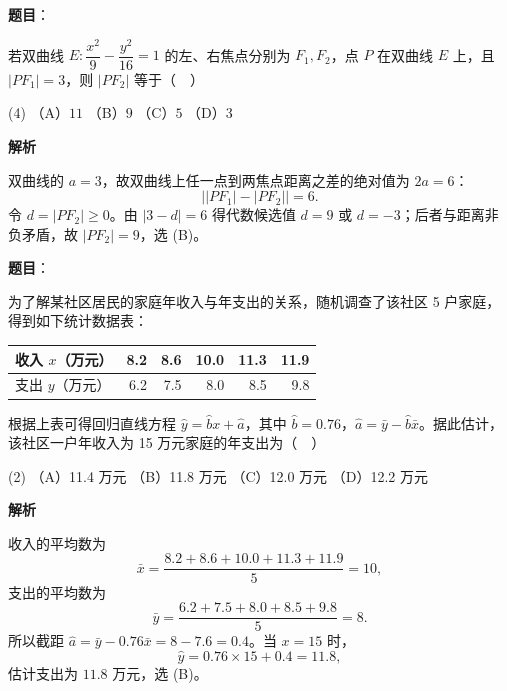 \begin{answer}

\textbf{题目}：

若双曲线 $E:\dfrac{x^2}{9}-\dfrac{y^2}{16}=1$ 的左、右焦点分别为 $F_1,F_2$，点 $P$ 在双曲线 $E$ 上，且 $|PF_1|=3$，则 $|PF_2|$ 等于（　）

\begin{gkopts}(4)
\task （A）$11$
\task （B）$9$
\task （C）$5$
\task （D）$3$
\end{gkopts}

\textbf{解析}

双曲线的 $a=3$，故双曲线上任一点到两焦点距离之差的绝对值为 $2a=6$：
\nopagebreak[4]
\[
\bigl||PF_1|-|PF_2|\bigr|=6.
\]
令 $d=|PF_2|\geqslant0$。由 $|3-d|=6$ 得代数候选值 $d=9$ 或 $d=-3$；后者与距离非负矛盾，故 $|PF_2|=9$，选 (B)。


\end{answer}
\begin{answer}

\textbf{题目}：

为了解某社区居民的家庭年收入与年支出的关系，随机调查了该社区 5 户家庭，得到如下统计数据表：

\begin{center}
\begin{tabular}{lrrrrr}
\toprule
收入 $x$（万元） & 8.2 & 8.6 & 10.0 & 11.3 & 11.9 \\
\midrule
支出 $y$（万元） & 6.2 & 7.5 & 8.0 & 8.5 & 9.8 \\
\bottomrule
\end{tabular}
\end{center}

根据上表可得回归直线方程 $\hat{y}=\hat{b}x+\hat{a}$，其中 $\hat{b}=0.76$，$\hat{a}=\bar{y}-\hat{b}\bar{x}$。据此估计，该社区一户年收入为 15 万元家庭的年支出为（　）

\begin{gkopts}(2)
\task （A）11.4 万元
\task （B）11.8 万元
\task （C）12.0 万元
\task （D）12.2 万元
\end{gkopts}

\textbf{解析}

收入的平均数为
\nopagebreak[4]
\[
\bar{x}=\frac{8.2+8.6+10.0+11.3+11.9}{5}=10,
\]
支出的平均数为
\nopagebreak[4]
\[
\bar{y}=\frac{6.2+7.5+8.0+8.5+9.8}{5}=8.
\]
所以截距 $\hat a=\bar y-0.76\bar x=8-7.6=0.4$。当 $x=15$ 时，
\nopagebreak[4]
\[
\hat y=0.76\times15+0.4=11.8,
\]
估计支出为 $11.8$ 万元，选 (B)。


\end{answer}
